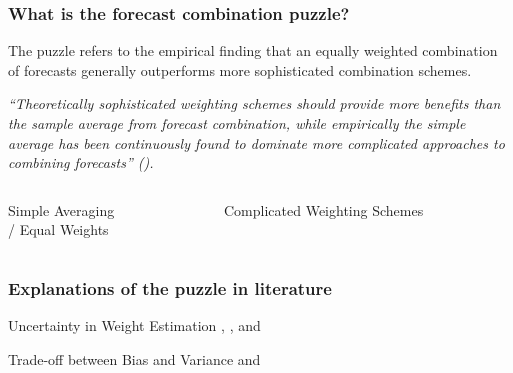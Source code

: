\begin{frame}
\frametitle{What is the forecast combination puzzle?}

    The puzzle refers to the empirical finding that an equally weighted combination of forecasts generally outperforms more sophisticated combination schemes.

    \vspace{5mm}

    \textit{“Theoretically sophisticated weighting schemes should provide more benefits than the sample average from forecast combination, while empirically the simple average has been continuously found to dominate more complicated approaches to combining forecasts” (\cite{WHLK22}).}

        \begin{columns}[t]
    \begin{column}{0.4\textwidth}
        \begin{block}{}
        \centering
        Simple Averaging \\
        / Equal Weights
        \end{block}
    \end{column}
    
    \begin{column}{0.5\textwidth}
        \begin{block}{}
        \centering
        Complicated Weighting Schemes
        \end{block}
    \end{column}
    \end{columns}
    
\end{frame}


\begin{frame}
    \frametitle{Explanations of the puzzle in literature}

        \begin{exampleblock}{\Large{Uncertainty in Weight Estimation}}
        \cite{SW98}, \cite{SW04}, and \cite{SW09}
        \end{exampleblock}

        \vspace{8mm}

        \begin{exampleblock}{\Large{Trade-off between Bias and Variance}}
        \cite{E11} and \cite{CMVW16}
        \end{exampleblock}

\end{frame}



